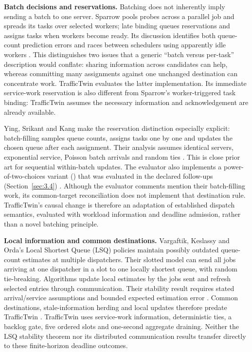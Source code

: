 \documentclass[12pt,a4paper]{article}
\begin{document}
\textbf{Batch decisions and reservations.} Batching does not inherently imply sending a batch to one server. Sparrow pools probes across a parallel job and spreads its tasks over selected workers; late binding queues reservations and assigns tasks when workers become ready. Its discussion identifies both queue-count prediction errors and races between schedulers using apparently idle workers \cite{ref15}. This distinguishes two issues that a generic ``batch versus per-task'' description would conflate: sharing information across candidates can help, whereas committing many assignments against one unchanged destination can concentrate work. TrafficTwin evaluates the latter implementation. Its immediate service-work reservation is also different from Sparrow's worker-triggered task binding: TrafficTwin assumes the necessary information and acknowledgement are already available.

Ying, Srikant and Kang make the reservation distinction especially explicit: batch-filling samples queue counts, assigns tasks one by one and updates the chosen queue after each assignment. Their analysis assumes identical servers, exponential service, Poisson batch arrivals and random ties \cite{ref16}. This is close prior art for sequential within-batch updates. The evaluator also implements a power-of-two-choices variant () that was evaluated in the declared follow-ups (Section~\ref{sec:3.4}) \cite{ref17}. Although the evaluator comments mention their batch-filling work, its common-target reconciliation does not implement that destination rule. TrafficTwin's causal change is therefore an adaptation of established dispatch semantics, evaluated with workload information and deadline admission, rather than a novel batching principle.

\textbf{Local information and common destinations.} Vargaftik, Keslassy and Orda's Local Shortest Queue (LSQ) policies maintain possibly outdated queue-count estimates at multiple dispatchers. Their slotted model can send all jobs arriving at one dispatcher in a slot to one locally shortest queue, with random tie-breaking. Algorithms update local estimates by the jobs sent and refresh selected entries through communication. Their stability result requires stated arrival/service assumptions and bounded expected estimation error \cite{ref18}. Common destinations, stale-information herding \cite{ref45} and local updates therefore predate TrafficTwin \cite{ref19}. TrafficTwin uses service-work information, deterministic ties, a backlog gate, five ordered slots and one-second aggregate draining. Neither the LSQ stability theorem nor its distributed communication results transfer directly to these finite-horizon deadline outcomes.
\end{document}
